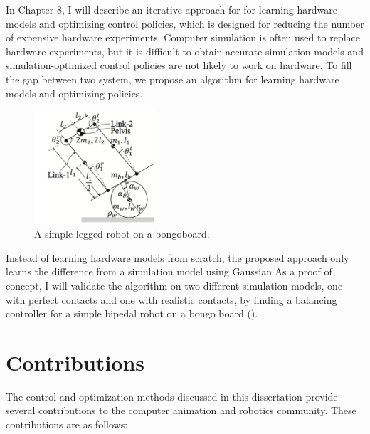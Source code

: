 In Chapter 8, I will describe an iterative approach for for learning 
hardware models and optimizing control policies, which is designed for
reducing the number of expensive hardware experiments.
Computer simulation is often used to replace hardware experiments,
but it is difficult to obtain accurate simulation models and
simulation-optimized control policies are not likely to work on hardware.
To fill the gap between two system, we propose an algorithm for learning
hardware models and optimizing policies. 
\begin{figure}
 \vspace{-10pt}
  \begin{center}
    \includegraphics[width=0.40\textwidth]{images/intro_simple_robot.png}
  \end{center}
   \vspace{-25pt}
  \caption{A simple legged robot on a bongoboard.}
  \label{fig:intro_bongo}
   \vspace{-10pt}
\end{figure}
Instead of learning hardware models from scratch, the proposed approach only
learns the difference from a simulation model using Gaussian 
As a proof of concept, I will validate the algorithm on two different 
simulation models, one with perfect contacts and one with realistic contacts,
by finding a balancing controller for a simple bipedal robot on a bongo board
().

\section{Contributions}
The control and optimization methods discussed in this dissertation provide
several contributions to the computer animation and robotics community. 
These contributions are as follows:

